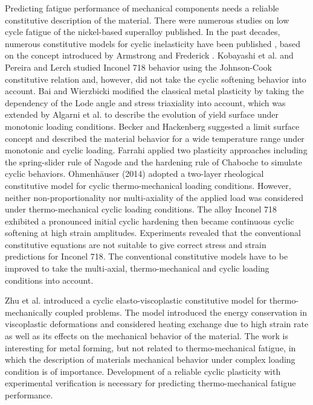 \documentclass[preprint,5p,twocolumn,11pt,sort&compress]{elsarticle}
\begin{document}
Predicting fatigue performance of mechanical components needs a reliable constitutive description of the material. There were numerous studies on low cycle fatigue of the nickel-based superalloy published. In the past decades, numerous constitutive models for cyclic inelasticity have been published \cite{ohno1993kinematic, Pun2014138, AbdelKarim2000225, Kang2004299}, based on the concept introduced by Armstrong and Frederick \cite{armstrong1966mathematical}. Kobayashi et al. \cite{Kobayashi2008389} and Pereira and Lerch \cite{Pereira2001715} studied Inconel 718 behavior using the Johnson-Cook constitutive relation and, however, did not take the cyclic softening behavior into account.
Bai and Wierzbicki \cite{Bai20081071} modified the classical metal plasticity by taking the dependency of the Lode angle and stress triaxiality into account, which was extended by Algarni et al.  \cite{Algarni2015140} to describe the evolution of yield surface under monotonic loading conditions. Becker and Hackenberg \cite{Becker2011596} suggested a limit surface concept and described the material behavior for a wide temperature range under monotonic and cyclic loading.
Farrahi  \cite{Farrahi2014245} applied two plasticity approaches including the spring-slider rule of Nagode and the hardening rule of Chaboche to simulate cyclic behaviors.
Ohmenh\"{a}user (2014) \cite{Ohmenhauser2014631} adopted a two-layer rheological constitutive model for cyclic thermo-mechanical loading conditions.
However, neither non-proportionality nor multi-axiality of the applied load was considered under thermo-mechanical cyclic loading conditions.
The alloy Inconel 718 exhibited a pronounced initial cyclic hardening then became continuous cyclic softening at high strain amplitudes. Experiments revealed that the conventional constitutive equations are not suitable to give correct stress and strain predictions for Inconel 718. The conventional constitutive models have to be improved to take the multi-axial, thermo-mechanical and cyclic loading conditions into account.

Zhu et al. \cite{ZHU2016} introduced a cyclic elasto-viscoplastic constitutive model for thermo-mechanically coupled problems. The model introduced the energy conservation in viscoplastic deformations and considered heating exchange due to high strain rate as well as its effects on the mechanical behavior of the material. The work is interesting for metal forming, but not related to thermo-mechanical fatigue, in which the description of materials mechanical behavior under complex loading condition is of importance. 
Development of a reliable cyclic plasticity with experimental verification is necessary for predicting thermo-mechanical fatigue performance.
\end{document}
